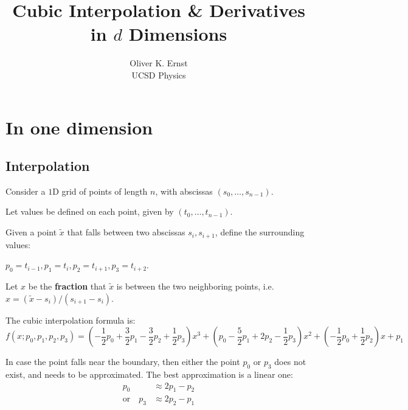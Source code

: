 \documentclass[11pt]{article}
\title{Cubic Interpolation \& Derivatives in $d$ Dimensions}
\author{Oliver K. Ernst \\ UCSD Physics}
\begin{document}
\maketitle

\tableofcontents


\section{In one dimension}



\subsection{Interpolation}


Consider a $1$D grid of points of length $n$, with abscissas $(s_0, \dots, s_{n-1})$.

Let values be defined on each point, given by $(t_0,\dots,t_{n-1})$.

Given a point $\tilde{x}$ that falls between two abscissas $s_i, s_{i+1}$, define the surrounding values:

$p_0 = t_{i-1}, p_1 = t_i, p_2 = t_{i+1}, p_3 = t_{i+2}$. 

Let $x$ be the \textbf{fraction} that $\tilde{x}$ is between the two neighboring points, i.e. $x = (\tilde{x} - s_i) / (s_{i+1} - s_i)$.

The cubic interpolation formula is:
\begin{equation}
f(x ; p_0, p_1, p_2, p_3) = \left ( - \frac{1}{2} p_0 + \frac{3}{2} p_1 - \frac{3}{2} p_2 + \frac{1}{2} p_3 \right ) x^3 + \left ( p_0 - \frac{5}{2} p_1 + 2 p_2 - \frac{1}{2} p_3 \right ) x^2 + \left ( - \frac{1}{2} p_0 + \frac{1}{2} p_2 \right ) x + p_1
\end{equation}

In case the point falls near the boundary, then either the point $p_0$ or $p_3$ does not exist, and needs to be approximated. The best approximation is a linear one:
\begin{equation}
\begin{split}
p_0 &\approx 2 p_1 - p_2 \\
\text{or} \quad p_3 &\approx 2 p_2 - p_1
\end{split}
\end{equation}
\end{document}

